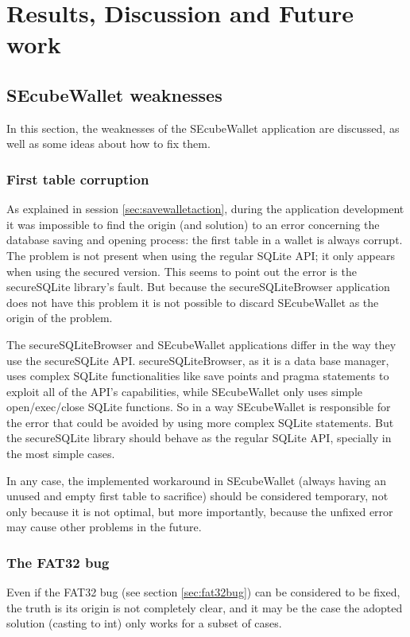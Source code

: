\chapter{Results, Discussion and Future work}

\section{SEcubeWallet weaknesses}
In this section, the weaknesses of the SEcubeWallet application are discussed, as well as some ideas about how to fix them.


\subsection{First table corruption}
As explained in session \ref{sec:savewalletaction}, during the application development it was impossible to find the origin (and solution) to an error concerning the database saving and opening process: the first table in a wallet is always corrupt. The problem is not present when using the regular SQLite API; it only appears when using the secured version. This seems to point out the error is the secureSQLite library's fault. But because the secureSQLiteBrowser application does not have this problem it is not possible to discard SEcubeWallet as the origin of the problem.

The secureSQLiteBrowser and SEcubeWallet applications differ in the way they use the secureSQLite API. secureSQLiteBrowser, as it is a data base manager, uses complex SQLite functionalities like save points and pragma statements to exploit all of the API's capabilities, while SEcubeWallet only uses simple open/exec/close SQLite functions. So in a way SEcubeWallet is responsible for the error that could be avoided by using more complex SQLite statements. But the secureSQLite library should behave as the regular SQLite API, specially in the most simple cases.

In any case, the implemented workaround in SEcubeWallet (always having an unused and empty first table to sacrifice) should be considered temporary, not only because it is not optimal, but more importantly, because the unfixed error may cause other problems in the future.

\subsection{The FAT32 bug}

Even if the FAT32 bug (see section \ref{sec:fat32bug}) can be considered to be fixed, the truth is its origin is not completely clear, and it may be the case the adopted solution (casting to int) only works for a subset of cases.

